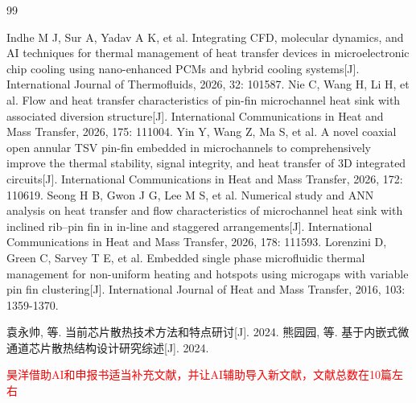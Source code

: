 \documentclass[stage1,fontset=fandol]{ydzjreport}
\begin{document}
\begin{thebibliography}{99}
	 
	   Indhe M J, Sur A, Yadav A K, et al. Integrating CFD, molecular dynamics, and AI techniques for thermal management of heat transfer devices in microelectronic chip cooling using nano-enhanced PCMs and hybrid cooling systems[J]. International Journal of Thermofluids, 2026, 32: 101587. 
	   Nie C, Wang H, Li H, et al. Flow and heat transfer characteristics of pin-fin microchannel heat sink with associated diversion structure[J]. International Communications in Heat and Mass Transfer, 2026, 175: 111004.
	   Yin Y, Wang Z, Ma S, et al. A novel coaxial open annular TSV pin-fin embedded in microchannels to comprehensively improve the thermal stability, signal integrity, and heat transfer of 3D integrated circuits[J]. International Communications in Heat and Mass Transfer, 2026, 172: 110619. 
	   Seong H B, Gwon J G, Lee M S, et al. Numerical study and ANN analysis on heat transfer and flow characteristics of microchannel heat sink with inclined rib–pin fin in in-line and staggered arrangements[J]. International Communications in Heat and Mass Transfer, 2026, 178: 111593. 
	   Lorenzini D, Green C, Sarvey T E, et al. Embedded single phase microfluidic thermal management for non-uniform heating and hotspots using microgaps with variable pin fin clustering[J]. International Journal of Heat and Mass Transfer, 2016, 103: 1359-1370. 
	 
	   袁永帅, 等. 当前芯片散热技术方法和特点研讨[J]. 2024.
	   熊园园, 等. 基于内嵌式微通道芯片散热结构设计研究综述[J]. 2024.
	\end{thebibliography}
	\textcolor{red}{昊洋借助AI和申报书适当补充文献，并让AI辅助导入新文献，文献总数在10篇左右}
\end{document}
